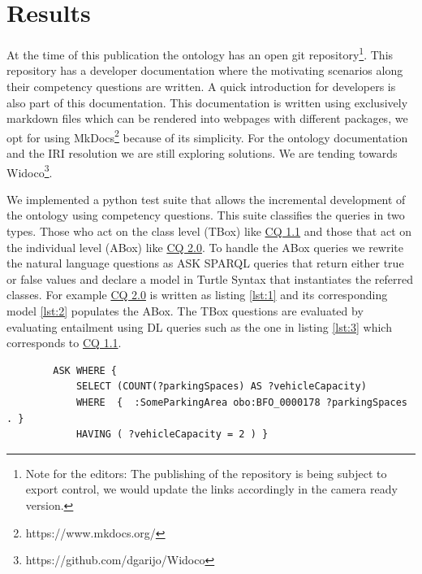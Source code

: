 \section{Results}
\label{results}

At the time of this publication the ontology has an open git
repository\footnote{Note for the editors: The publishing of the repository is
being subject to export control, we would update the links accordingly in the
camera ready version. }. This repository has a developer documentation where the
motivating scenarios along their competency questions are written. A quick
introduction for developers is also part of this documentation. This
documentation is written using exclusively markdown files which can be rendered
into webpages with different packages, we opt for using
MkDocs\footnote{https://www.mkdocs.org/} because of its simplicity. For the
ontology documentation and the IRI resolution we are still exploring solutions.
We are tending towards Widoco\footnote{https://github.com/dgarijo/Widoco}.

We implemented a python test suite that allows the incremental development of
the ontology using competency questions. This suite classifies the queries in
two types. Those who act on the class level (TBox) like \hyperref[CQ1.1]{CQ 1.1}
and those that act on the individual level (ABox) like \hyperref[CQ2.0]{CQ 2.0}.
To handle the ABox queries we rewrite the natural language questions as ASK
SPARQL queries that return either true or false values and declare a model in
Turtle Syntax that instantiates the referred classes. For example
\hyperref[CQ2.0]{CQ 2.0} is written as listing \ref{lst:1} and its corresponding
model \ref{lst:2} populates the ABox. The TBox questions are evaluated by
evaluating entailment using DL queries such as the one in listing \ref{lst:3}
which corresponds to \hyperref[CQ1.1]{CQ 1.1}.

\begin{listing}[h]
    
    \begin{verbatim}
        ASK WHERE {
            SELECT (COUNT(?parkingSpaces) AS ?vehicleCapacity)  
            WHERE  {  :SomeParkingArea obo:BFO_0000178 ?parkingSpaces . }
            HAVING ( ?vehicleCapacity = 2 ) }
    \end{verbatim}
    \caption{Example ABox query. (Given a parking area with two parking places) What is the (vehicle) capacity of parking lot P? (2). The namespaces are omitted.}
    \label{lst:1}
\end{listing}

